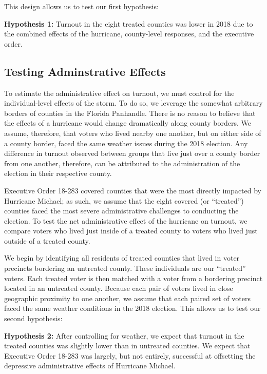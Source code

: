 \documentclass[
  12pt,
]{article}
\begin{document}
This design allows us to test our first hypothesis:

\textbf{Hypothesis 1:} Turnout in the eight treated counties was lower in 2018 due to the combined effects of the hurricane, county-level responses, and the executive order.

\hypertarget{testing-adminstrative-effects}{%
\subsection*{Testing Adminstrative Effects}\label{testing-adminstrative-effects}}

To estimate the administrative effect on turnout, we must control for the individual-level effects of the storm. To do so, we leverage the somewhat arbitrary borders of counties in the Florida Panhandle. There is no reason to believe that the effects of a hurricane would change dramatically along county borders. We assume, therefore, that voters who lived nearby one another, but on either side of a county border, faced the same weather issues during the 2018 election. Any difference in turnout observed between groups that live just over a county border from one another, therefore, can be attributed to the administration of the election in their respective county.

Executive Order 18-283 covered counties that were the most directly impacted by Hurricane Michael; as such, we assume that the eight covered (or ``treated'') counties faced the most severe administrative challenges to conducting the election. To test the net administrative effect of the hurricane on turnout, we compare voters who lived just inside of a treated county to voters who lived just outside of a treated county.

We begin by identifying all residents of treated counties that lived in voter precincts bordering an untreated county. These individuals are our ``treated'' voters. Each treated voter is then matched with a voter from a bordering precinct located in an untreated county. Because each pair of voters lived in close geographic proximity to one another, we assume that each paired set of voters faced the same weather conditions in the 2018 election. This allows us to test our second hypothesis:

\textbf{Hypothesis 2:} After controlling for weather, we expect that turnout in the treated counties was slightly lower than in untreated counties. We expect that Executive Order 18-283 was largely, but not entirely, successful at offsetting the depressive administrative effects of Hurricane Michael.
\end{document}
